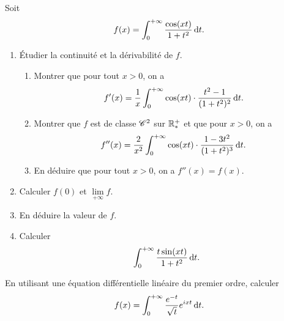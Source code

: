 \documentclass{yann}
\newcommand\I{i}
\begin{document}
\Exercice

Soit \[ f(x) = \int_0^{+\infty} \frac{\cos(xt)}{1+t^2} \mathop{}\!\mathrm{d} t. \]
\begin{enumerate}
\item
Étudier la continuité et la dérivabilité de $f$.

  \begin{enumerate}
  \item
Montrer que pour tout $x > 0$, on a
    \[ f'(x) = \frac{1}{x}\int_0^{+\infty} \cos(xt)\cdot\frac{t^2 - 1}{(1+t^2)^2} \mathop{}\!\mathrm{d} t. \]
  \item
Montrer que $f$ est de classe $\mathscr{C}^{2}$ sur $\mathbb{R}^+_*$ et que pour $x > 0$, on a
    \[ f''(x) = \frac{2}{x^2}\int_0^{+\infty} \cos(xt)\cdot\frac{1-3t^2}{(1+t^2)^3} \mathop{}\!\mathrm{d} t. \]
  \item
En déduire que pour tout $x > 0$, on a $f''(x) = f(x)$.
  \end{enumerate}
\item
Calculer $f(0)$ et $\lim\limits_{+\infty} f$.
\item
En déduire la valeur de $f$.
\item
Calculer \[ \int_0^{+\infty} \frac{t\sin(xt)}{1+t^2}\mathop{}\!\mathrm{d} t. \]
\end{enumerate}

\Exercice

En utilisant une équation différentielle linéaire du premier ordre, calculer
\[ f(x) =\int_0^{+\infty} \frac{e^{-t}}{\sqrt t}{e^{\I x t}} \D t. \]
\end{document}
